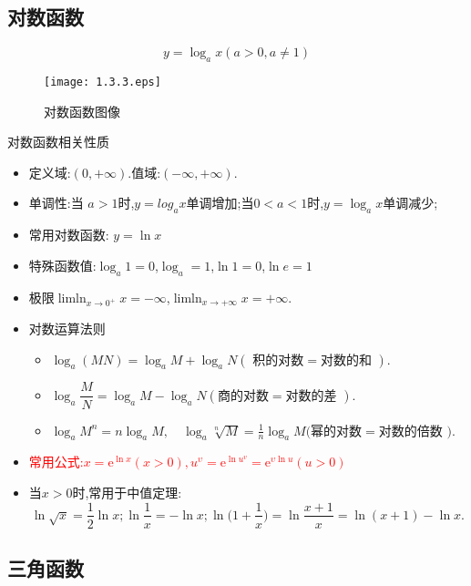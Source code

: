 \documentclass[8pt a4paper, oneside, UTF8]{ctexbook}  %
\begin{document}
\begin{sloppypar}
    \subsection{对数函数}
    $$
        y=\log_a x (a>0,a \neq 1)
    $$
    \begin{figure}[H]
        \centering \texttt{[image: 1.3.3.eps]} \caption{对数函数图像}
    \end{figure}
    \begin{criterion}{对数函数相关性质}{}
        \begin{itemize}
            \item 定义域:$(0,+\infty)$.值域:$(-\infty,+\infty)$.
            \item 单调性:当 $a>1$时,$y=log_a x$单调增加;当$0<a<1$时,$y=\log_a x$单调减少;
            \item 常用对数函数: $y=\ln x$
            \item 特殊函数值:$\log_a 1=0$,$\log_a=1$,$\ln 1=0$,$\ln e=1$
            \item 极限$\operatorname*{lim ln}_{x\to0^{+}}x=-\infty$,$\operatorname*{lim ln}_{x\to+\infty}x=+\infty$.
            \item 对数运算法则
                  \begin{itemize}
                      \item $\log_{a}\left(MN\right)=\log_{a}M+\log_{a}N\left(\text{ 积的对数}=\text{对数的和 }\right).$
                      \item $\log_{a}\dfrac{M}{N}=\log_{a}M-\log_{a}N\left(商的对数=\text{对数的差 }\right).$
                      \item $\log_aM^n=n\log_aM,\quad\log_a\sqrt[n]{M}=\frac1n\log_aM\text{(幂的对数}=\text{对数的倍数 }).$
                  \end{itemize}
            \item \textcolor{red}{常用公式:$x=\mathrm{e}^{\ln x}\left(x>0\right),u^{\upsilon}=\mathrm{e}^{\ln u^v}=\mathrm{e}^{\upsilon\ln u}\left(u>0\right)$}
            \item 当$x>0$时,常用于中值定理:
                  $$
                      \ln\sqrt{x}=\frac{1}{2}\ln x;\ln\frac{1}{x}=-\ln x;\ln\biggl(1+\frac{1}{x}\biggr)=\ln\frac{x+1}{x}=\ln(x+1)-\ln x.
                  $$
        \end{itemize}
    \end{criterion}
    \subsection{三角函数}


\end{sloppypar}
\end{document}
